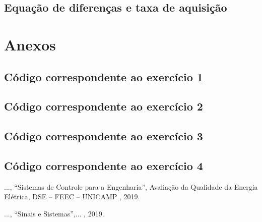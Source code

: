 \documentclass[a4paper,12pt,oneside,openany,table,xcdraw]{article}
\begin{document}
\subsection{Equação de diferenças e taxa de aquisição}



\section{Anexos}
\subsection{Código correspondente ao exercício 1} \label{anexo:ex1}


\subsection{Código correspondente ao exercício 2} \label{anexo:ex2}


\subsection{Código correspondente ao exercício 3} \label{anexo:ex3}


\subsection{Código correspondente ao exercício 4} \label{anexo:ex4}


\newpage
\begin{thebibliography}{9} 
    ...,
    “Sistemas de Controle para a Engenharia”, Avaliação da Qualidade da Energia Elétrica, DSE – FEEC – UNICAMP , 2019.
 
    ...,
    “Sinais e Sistemas”,... , 2019.

\end{thebibliography}
\end{document}

